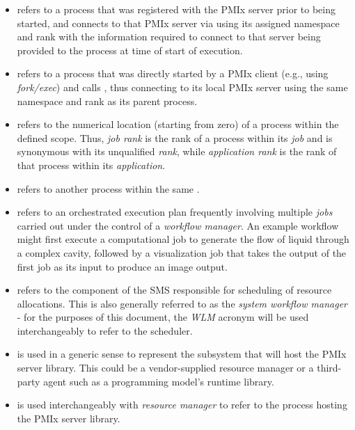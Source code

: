 \begin{itemize}
\item {} refers to a process that was registered with the \ac{PMIx} server prior to being started, and connects to that \ac{PMIx} server via  using its assigned namespace and rank with the information required to connect to that server being provided to the process at time of start of execution.

\item {} refers to a process that was directly started by a \ac{PMIx} client (e.g., using \emph{fork/exec}) and calls , thus connecting to its local \ac{PMIx} server using the same namespace and rank as its parent process.

\item {} refers to the numerical location (starting from zero) of a process within the defined scope. Thus, \emph{job rank} is the rank of a process within its \emph{job} and is synonymous with its unqualified \emph{rank}, while \emph{application rank} is the rank of that process within its \emph{application}.

\item {} refers to another process within the same .

\item {} refers to an orchestrated execution plan frequently involving multiple \emph{jobs} carried out under the control of a \emph{workflow manager}. An example workflow might first execute a computational job to generate the flow of liquid through a complex cavity, followed by a visualization job that takes the output of the first job as its input to produce an image output.

\item {} refers to the component of the \ac{SMS} responsible for scheduling of resource allocations. This is also generally referred to as the \emph{system workflow manager} - for the purposes of this document, the \emph{WLM} acronym will be used interchangeably to refer to the scheduler.

\item {} is used in a generic sense to represent the subsystem that will host the \ac{PMIx} server library. This could be a vendor-supplied resource manager or a third-party agent such as a programming model's runtime library.

\item {} is used interchangeably with \emph{resource manager} to refer to the process hosting the \ac{PMIx} server library.


\end{itemize}
